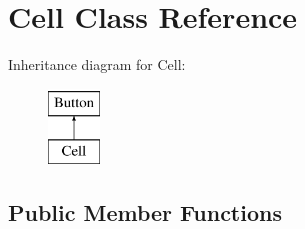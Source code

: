\hypertarget{classCell}{}\section{Cell Class Reference}
\label{classCell}
Inheritance diagram for Cell\+:\begin{figure}[H]
\begin{center}
\leavevmode
\includegraphics[height=2.000000cm]{classCell}
\end{center}
\end{figure}
\subsection*{Public Member Functions}
